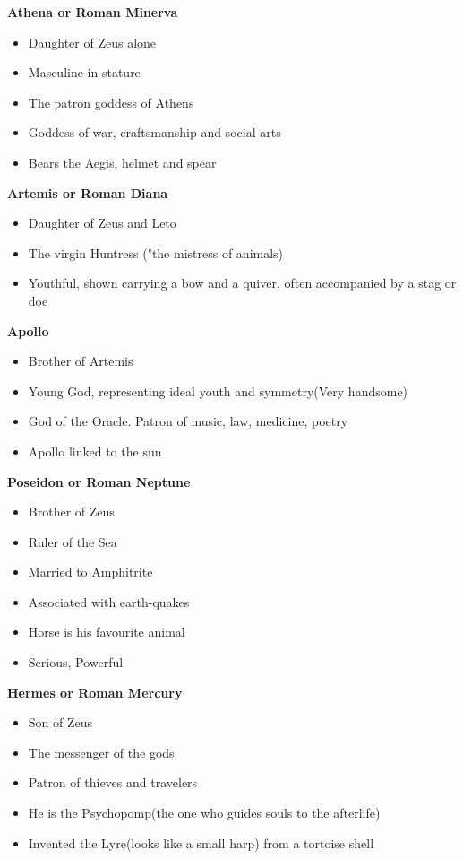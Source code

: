\documentclass[12pt,a4paper]{report}
\begin{document}
\textbf{Athena or Roman Minerva}
\begin{itemize}
\item Daughter of Zeus alone
\item Masculine in stature
\item The patron goddess of Athens
\item Goddess of war, craftsmanship and social arts
\item Bears the Aegis, helmet and spear
\end{itemize}

\textbf{Artemis or Roman Diana}
\begin{itemize}
\item Daughter of Zeus and Leto
\item The virgin Huntress ("the mistress of animals)
\item Youthful, shown carrying a bow and a quiver, often accompanied by a stag or doe
\end{itemize}

\textbf{Apollo}
\begin{itemize}
\item Brother of Artemis
\item Young God, representing ideal youth and symmetry(Very handsome)
\item God of the Oracle. Patron of music, law, medicine, poetry
\item Apollo linked to the sun
\end{itemize}

\textbf{Poseidon or Roman Neptune}
\begin{itemize}
\item Brother of Zeus
\item Ruler of the Sea
\item Married to Amphitrite
\item Associated with earth-quakes
\item Horse is his favourite animal
\item Serious, Powerful
\end{itemize}

\textbf{Hermes or Roman Mercury}
\begin{itemize}
\item Son of Zeus
\item The messenger of the gods
\item Patron of thieves and travelers
\item He is the Psychopomp(the one who guides souls to the afterlife)
\item Invented the Lyre(looks like a small harp) from a tortoise shell
\end{itemize}
\end{document}
